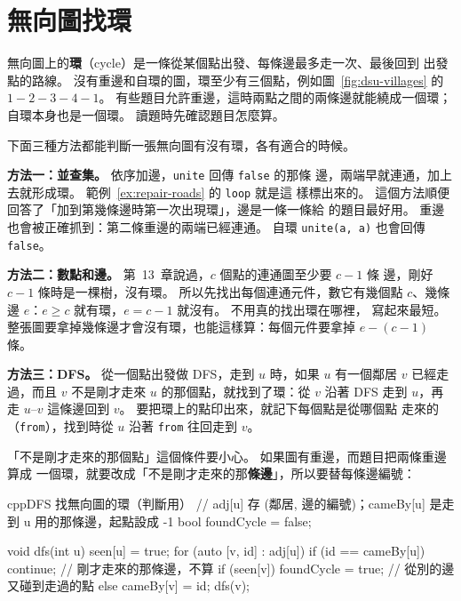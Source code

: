 \section{無向圖找環}
\label{sec:cycle-undirected}

無向圖上的\textbf{環}（cycle）是一條從某個點出發、每條邊最多走一次、最後回到
出發點的路線。 沒有重邊和自環的圖，環至少有三個點，例如圖~\ref{fig:dsu-villages}
的 $1 - 2 - 3 - 4 - 1$。 有些題目允許重邊，這時兩點之間的兩條邊就能繞成一個環；
自環本身也是一個環。 讀題時先確認題目怎麼算。

下面三種方法都能判斷一張無向圖有沒有環，各有適合的時候。

\textbf{方法一：並查集。} 依序加邊，\texttt{unite} 回傳 \texttt{false} 的那條
邊，兩端早就連通，加上去就形成環。 範例~\ref{ex:repair-roads} 的 \texttt{loop} 就是這
樣標出來的。 這個方法順便回答了「加到第幾條邊時第一次出現環」，邊是一條一條給
的題目最好用。 重邊也會被正確抓到：第二條重邊的兩端已經連通。 自環
\texttt{unite(a, a)} 也會回傳 \texttt{false}。

\textbf{方法二：數點和邊。} 第~13~章說過，$c$ 個點的連通圖至少要 $c - 1$ 條
邊，剛好 $c - 1$ 條時是一棵樹，沒有環。 所以先找出每個連通元件，數它有幾個點
$c$、幾條邊 $e$：$e \ge c$ 就有環，$e = c - 1$ 就沒有。 不用真的找出環在哪裡，
寫起來最短。 整張圖要拿掉幾條邊才會沒有環，也能這樣算：每個元件要拿掉
$e - (c - 1)$ 條。

\textbf{方法三：DFS。} 從一個點出發做 DFS，走到 $u$ 時，如果 $u$ 有一個鄰居 $v$
已經走過，而且 $v$ 不是剛才走來 $u$ 的那個點，就找到了環：從 $v$ 沿著 DFS 走到
$u$，再走 $u$--$v$ 這條邊回到 $v$。 要把環上的點印出來，就記下每個點是從哪個點
走來的（\texttt{from}），找到時從 $u$ 沿著 \texttt{from} 往回走到 $v$。

「不是剛才走來的那個點」這個條件要小心。 如果圖有重邊，而題目把兩條重邊算成
一個環，就要改成「不是剛才走來的那\textbf{條邊}」，所以要替每條邊編號：

\begin{code}{cpp}{DFS 找無向圖的環（判斷用）}
// adj[u] 存 (鄰居, 邊的編號)；cameBy[u] 是走到 u 用的那條邊，起點設成 -1
bool foundCycle = false;

void dfs(int u) {
    seen[u] = true;
    for (auto [v, id] : adj[u]) {
        if (id == cameBy[u]) {
            continue;                  // 剛才走來的那條邊，不算
        }
        if (seen[v]) {
            foundCycle = true;         // 從別的邊又碰到走過的點
        } else {
            cameBy[v] = id;
            dfs(v);
        }
    }
}
\end{code}

